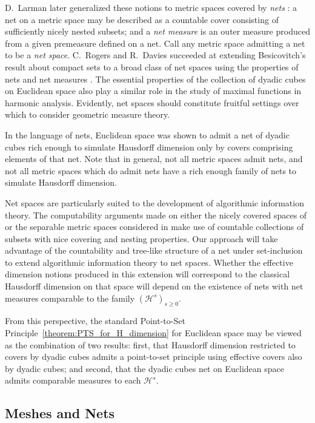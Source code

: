 D.~Larman later generalized these notions to metric spaces covered by \textit{nets} \cite{Lar67}: a net on a metric space may be described as a countable cover consisting of sufficiently nicely nested subsets; and a \textit{net measure} is an outer measure produced from a given premeasure defined on a net. Call any metric space admitting a net to be a \textit{net space}. C.~Rogers and R.~Davies succeeded at extending Besicovitch's result about compact sets to a broad class of net spaces using the properties of nets and net measures \cite{Rog70}. The essential properties of the collection of dyadic cubes on Euclidean space also play a similar role in the study of maximal functions in harmonic analysis. Evidently, net spaces should constitute fruitful settings over which to consider geometric measure theory. 

In the language of nets, Euclidean space was shown to admit a net of dyadic cubes rich enough to simulate Hausdorff dimension only by covers comprising elements of that net. Note that in general, not all metric spaces admit nets, and not all metric spaces which do admit nets have a rich enough family of nets to simulate Hausdorff dimension.

Net spaces are particularly suited to the development of algorithmic information theory. The computability arguments made on either the nicely covered spaces of \cite{May14} or the separable metric spaces considered in \cite{LLM23} 
make use of countable collections of subsets with nice covering and nesting properties. Our approach will take advantage of the countability and tree-like structure of a net under set-inclusion to extend algorithmic information theory to net spaces. Whether the effective dimension notions produced in this extension will correspond to the classical Hausdorff dimension on that space will depend on the existence of nets with net measures comparable to the family $(\mathcal{H}^s)_{s \geq 0}$. 

From this perspective, the standard Point-to-Set Principle~\ref{theorem:PTS_for_H_dimension} for Euclidean space may be viewed as the combination of two results: first, that Hausdorff dimension restricted to covers by dyadic cubes admits a point-to-set principle using effective covers also by dyadic cubes; and second, that the dyadic cubes net on Euclidean space admits comparable measures to each $\mathcal{H}^s$. 

\subsection{Meshes and Nets}

